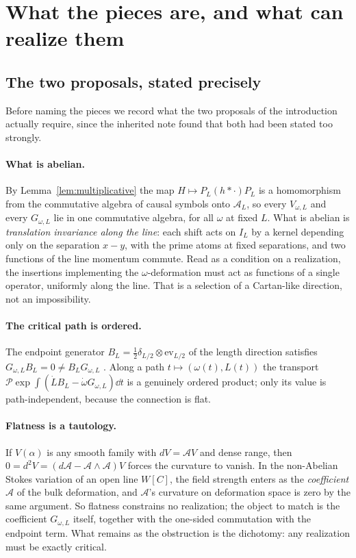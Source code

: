 \section{What the pieces are, and what can realize them}\label{sec:realizations}

\subsection{The two proposals, stated precisely}\label{sec:proposals}

Before naming the pieces we record what the two proposals of the introduction
actually require, since the inherited note \cite{LoewnerNote} found that both
had been stated too strongly.

\paragraph{What is abelian.} By Lemma~\ref{lem:multiplicative} the map
$H\mapsto P_L(h*\cdot)P_L$ is a homomorphism from the commutative algebra of
causal symbols onto $\mathcal A_L$, so every $V_{\omega,L}$ and every
$G_{\omega,L}$ lie in one commutative algebra, for all $\omega$ at fixed $L$.
What is abelian is \emph{translation invariance along the line}: each shift
acts on $I_L$ by a kernel depending only on the separation $x-y$, with the
prime atoms at fixed separations, and two functions of the line momentum
commute. Read as a condition on a realization, the insertions implementing the
$\omega$-deformation must act as functions of a single operator, uniformly
along the line. That is a selection of a Cartan-like direction, not an
impossibility.

\paragraph{The critical path is ordered.} The endpoint generator
$B_L=\frac12\delta_{L/2}\otimes\mathrm{ev}_{L/2}$ of the length direction
satisfies $G_{\omega,L}B_L=0\neq B_LG_{\omega,L}$ \cite[Proposition~9.3]{WilsonLines}.
Along a path $t\mapsto(\omega(t),L(t))$ the transport
$\mathcal P\exp\int(\dot LB_L-\dot\omega G_{\omega,L})\dd t$ is a genuinely
ordered product; only its value is path-independent, because the connection is
flat.

\paragraph{Flatness is a tautology.} If $V(\alpha)$ is any smooth family with
$dV=\mathcal AV$ and dense range, then $0=d^2V=(d\mathcal A-\mathcal A\wedge\mathcal A)V$
forces the curvature to vanish. In the non-Abelian Stokes variation of an open
line $W[C]$, the field strength enters as the \emph{coefficient} $\mathcal A$
of the bulk deformation, and $\mathcal A$'s curvature on deformation space is
zero by the same argument. So flatness constrains no realization; the object
to match is the coefficient $G_{\omega,L}$ itself, together with the one-sided
commutation with the endpoint term. What remains as the obstruction is the
dichotomy: any realization must be exactly critical.

